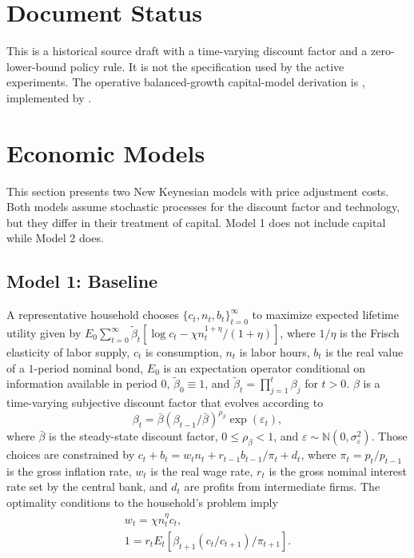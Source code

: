 \documentclass[12pt,final]{article}
\begin{document}
\section*{Document Status}
This is a historical source draft with a time-varying discount factor and a
zero-lower-bound policy rule. It is not the specification used by the active
experiments. The operative balanced-growth capital-model derivation is
, implemented by
.

\section{Economic Models} \label{sec:models}

This section presents two New Keynesian models with \citet{Rotemberg1982} price adjustment costs. Both models assume stochastic processes for the discount factor and technology, but they differ in their treatment of capital. Model 1 does not include capital while Model 2 does.

\subsection{Model 1: Baseline}\label{sec:model1}

A representative household chooses $\{c_t,n_t,b_t\}_{t=0}^\infty$ to maximize expected lifetime utility given by $E_0\sum_{t=0}^\infty\tilde{\beta}_t[\log c_t-\chi n_t^{1+\eta}/(1+\eta)]$, where $1/\eta$ is the Frisch elasticity of labor supply, $c_t$ is consumption, $n_t$ is labor hours, $b_t$ is the real value of a $1$-period nominal bond, $E_0$ is an expectation operator conditional on information available in period $0$, $\tilde{\beta}_0\equiv1$, and $\tilde{\beta}_t=\prod_{j=1}^t \beta_j$ for $t>0$. $\beta$ is a time-varying subjective discount factor that evolves according to
\begin{equation}
  \beta_t=\bar{\beta}(\beta_{t-1}/\bar{\beta})^{\rho_{\beta}}\exp(\varepsilon_t), \label{discount factor process}
\end{equation}
where $\bar{\beta}$ is the steady-state discount factor, $0\leq\rho_\beta<1$, and $\varepsilon\sim\mathbb{N}(0,\sigma_\varepsilon^2)$. Those choices are constrained by $c_t+b_t=w_tn_t+r_{t-1}b_{t-1}/\pi_t+d_t$, where $\pi_t=p_t/p_{t-1}$ is the gross inflation rate, $w_t$ is the real wage rate, $r_t$ is the gross nominal interest rate set by the central bank, and $d_t$ are profits from intermediate firms. The optimality conditions to the household's problem imply
\begin{gather}
  w_t=\chi n_t^\eta c_t,  \label{FOC labor} \\
  1= r_tE_t[\beta_{t+1}(c_t/c_{t+1})/\pi_{t+1}]. \label{bond euler1}
\end{gather}
\end{document}
